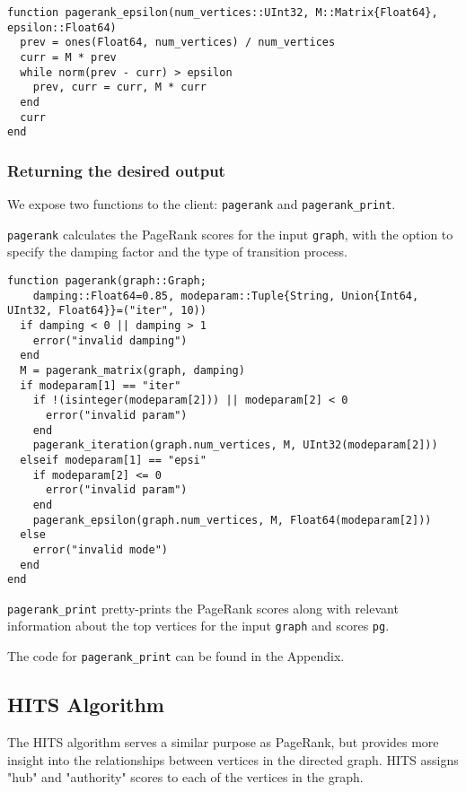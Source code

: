 \documentclass[12pt, titlepage, twoside]{amsart}
\begin{document}
\begin{verbatim}
function pagerank_epsilon(num_vertices::UInt32, M::Matrix{Float64}, epsilon::Float64)
  prev = ones(Float64, num_vertices) / num_vertices
  curr = M * prev
  while norm(prev - curr) > epsilon
    prev, curr = curr, M * curr
  end
  curr
end
\end{verbatim}

\subsubsection{Returning the desired output}

We expose two functions to the client: \texttt{pagerank} and \texttt{pagerank_print}.

\texttt{pagerank} calculates the PageRank scores for the input \texttt{graph},
with the option to specify the damping factor and the type of transition process.

\begin{verbatim}
function pagerank(graph::Graph;
    damping::Float64=0.85, modeparam::Tuple{String, Union{Int64, UInt32, Float64}}=("iter", 10))
  if damping < 0 || damping > 1
    error("invalid damping")
  end
  M = pagerank_matrix(graph, damping)
  if modeparam[1] == "iter"
    if !(isinteger(modeparam[2])) || modeparam[2] < 0
      error("invalid param")
    end
    pagerank_iteration(graph.num_vertices, M, UInt32(modeparam[2]))
  elseif modeparam[1] == "epsi"
    if modeparam[2] <= 0
      error("invalid param")
    end
    pagerank_epsilon(graph.num_vertices, M, Float64(modeparam[2]))
  else
    error("invalid mode")
  end
end
\end{verbatim}

\texttt{pagerank_print} pretty-prints the PageRank scores along with relevant information about the top
vertices for the input \texttt{graph} and scores \texttt{pg}.

The code for \texttt{pagerank_print} can be found in the Appendix.

\subsection{HITS Algorithm}

The HITS algorithm serves a similar purpose as PageRank,
but provides more insight into the relationships between vertices in the directed graph.
HITS assigns "hub" and "authority" scores to each of the vertices in the graph.
\end{document}

